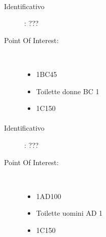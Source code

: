 \documentclass[../SperimentazioniPratiche.tex]{subfiles}
\begin{document}
			\paragraph*{}
			\label{01002}
			\begin{tcolorbox}[fonttitle=\bfseries, 
								adjusted title={\Large Beacon 01002},
								sharp corners=south,
								colback=white, 
								colframe=white!50!blue!75!black]
								
				\begin{description}
					\item[Identificativo]: ???

					\tcbline					
					
					\item[Point Of Interest:] \ \par
					\begin{itemize}
						\item 1BC45
						\item Toilette donne BC 1
						\item 1C150
					\end{itemize}					   				
				\end{description}  				
			\end{tcolorbox}
			
			\paragraph*{}
			\label{01003}
			\begin{tcolorbox}[fonttitle=\bfseries, 
								adjusted title={\Large Beacon 01003},
								sharp corners=south,
								colback=white, 
								colframe=white!50!blue!75!black]
								
				\begin{description}
					\item[Identificativo]: ???

					\tcbline					
					
					\item[Point Of Interest:] \ \par
					\begin{itemize}
						\item 1AD100
						\item Toilette uomini AD 1
						\item 1C150
					\end{itemize}					   				
				\end{description}  				
			\end{tcolorbox}
			
\end{document}
